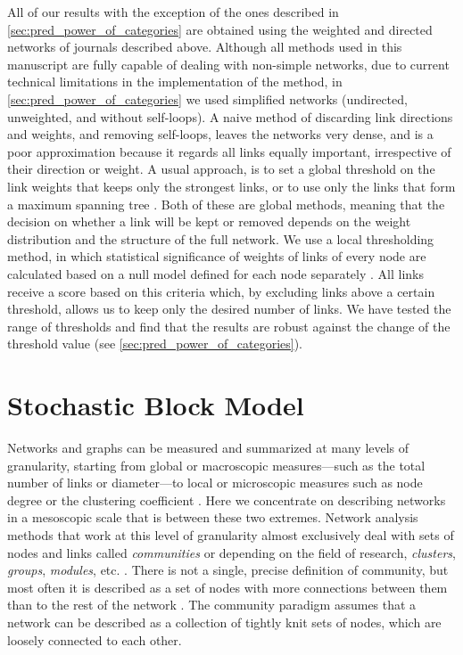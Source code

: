 \documentclass[a4paper,12pt]{article}
\begin{document}
All of our results with the exception of the ones described in \cref{sec:pred_power_of_categories} are obtained using the weighted and directed networks of journals described above. 
Although all methods used in this manuscript
are fully capable of dealing with non-simple networks,
due to current technical limitations in the implementation of the method,
in \cref{sec:pred_power_of_categories} we used simplified networks (undirected, unweighted, and without self-loops).
A naive method of discarding link directions and weights,  
and removing self-loops, leaves the networks very dense, and is a poor approximation because 
it regards all links equally important, irrespective of their direction or weight. A usual approach, is to set a global threshold on the link weights that keeps only the strongest links, or to use only the links that form a maximum spanning  tree \citep{Kruskal1956,Macdonald2005}. Both of these are global methods, meaning that the decision on whether a link will be kept or removed depends on the weight distribution and the structure of the full network. We use a local thresholding method, in which statistical significance of weights of links of every node are calculated based on a null model defined for each node separately \citep{Serrano2009}. All links receive a score based on this criteria which, by excluding links above a certain threshold, allows us to keep only the desired number of links. We have tested the range of thresholds and find that the results are robust against the change of the threshold value (see \cref{sec:pred_power_of_categories}).


\section{Stochastic Block Model}
\label{sec:SBM}


Networks and graphs can be measured and summarized at many levels of granularity, starting from global or macroscopic measures---such as the total number of links or diameter---to local
or microscopic measures such as node degree or the clustering coefficient \citep{Newman2010Introduction}.
Here we concentrate on describing networks in a mesoscopic scale that is between these two extremes. 
Network analysis methods that work at this level of granularity almost exclusively deal with sets of nodes and links
called \emph{communities} or depending on the field of research, \emph{clusters}, \emph{groups}, \emph{modules}, etc.  \citep{Wasserman1994,Boccaletti2006,Schaeffer2007,Fortunato2010}.
There is not a single, precise definition of community, but most often it is described as 
a set of nodes with more connections between them than to the rest of the network \citep{Porter2009Communities,Fortunato2010}.
The community paradigm assumes that a network can be described as a collection of tightly knit sets of nodes, which are loosely connected to each other. 
\end{document}
